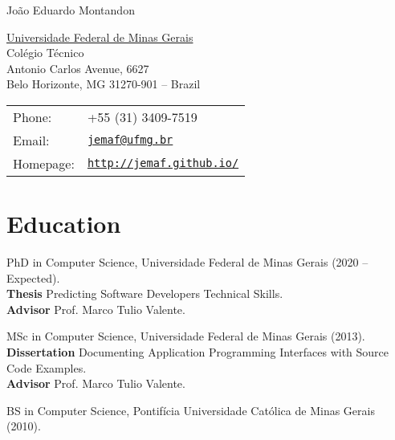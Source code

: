 \documentclass[letterpaper]{article}
\def\name{João Eduardo Montandon}
\renewenvironment{itemize}{
  \begin{list}{}{
    \setlength{\leftmargin}{1.5em}
  }
}{
  \end{list}
}
\begin{document}
{\huge \name}


\vspace{0.25in}

\begin{minipage}{0.45\linewidth}
  \href{http://ufmg.br/}{Universidade Federal de Minas Gerais} \\
  Colégio Técnico \\
  Antonio Carlos Avenue, 6627 \\
  Belo Horizonte, MG 31270-901 -- Brazil
\end{minipage}
\begin{minipage}{0.45\linewidth}
  \begin{tabular}{ll}
    Phone: & +55 (31) 3409-7519 \\
    Email: & \href{mailto:jemaf@ufmg.br}{\tt jemaf@ufmg.br} \\
    Homepage: & \href{http://jemaf.github.io/}{\tt http://jemaf.github.io/} \\
  \end{tabular}
\end{minipage}


\section*{Education}
\begin{itemize}
  \item PhD in Computer Science, Universidade Federal de Minas Gerais (2020 -- Expected). \\
  \textbf{Thesis} Predicting Software Developers Technical Skills. \\
  \textbf{Advisor} Prof. Marco Tulio Valente.
  \item MSc in Computer Science, Universidade Federal de Minas Gerais (2013). \\
  \textbf{Dissertation} Documenting Application Programming Interfaces with Source Code Examples. \\
  \textbf{Advisor} Prof. Marco Tulio Valente.
  \item BS in Computer Science, Pontifícia Universidade Católica de Minas Gerais (2010).
\end{itemize}
\end{document}
